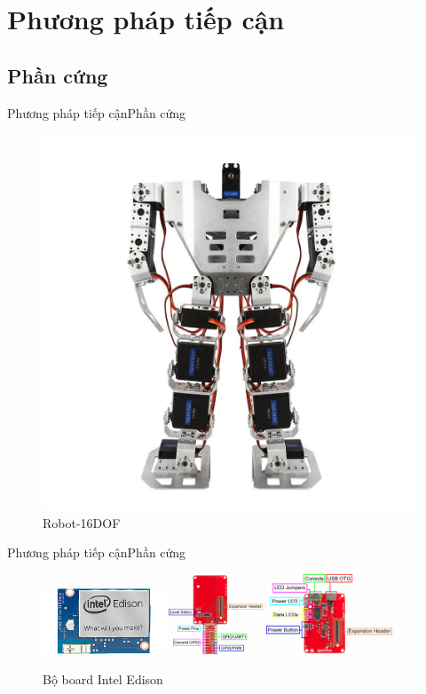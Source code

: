\documentclass[compress, blue, 13pt,hyperref={pdfpagemode=FullScreen}]{beamer}
\begin{document}
\section{Phương pháp tiếp cận}
\subsection{Phần cứng}
\begin{frame}{Phương pháp tiếp cận}{Phần cứng}
\transblindshorizontal
\begin{figure}[hbtp]
\centering
\includegraphics[scale=0.15]{images/01_150_2_1024x1024.jpg}
\caption{Robot-16DOF}
\end{figure}
\end{frame}
\begin{frame}{Phương pháp tiếp cận}{Phần cứng}
\transblindshorizontal
\begin{figure}[hbtp]
\centering
\includegraphics[height = 2cm]{images/MakerBoards-Edison.jpg}
\includegraphics[height = 2.4cm]{images/GPIOBlockAnnotated.png}
\includegraphics[height = 2.4cm]{images/BaseAnnotated.png}
\caption{Bộ board Intel Edison}
\end{figure}
\end{frame}
\end{document}
